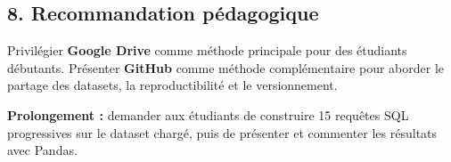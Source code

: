 \documentclass[
]{article}
\begin{document}
\subsection{8. Recommandation
pédagogique}\label{recommandation-puxe9dagogique}

Privilégier \textbf{Google Drive} comme méthode principale pour des
étudiants débutants. Présenter \textbf{GitHub} comme méthode
complémentaire pour aborder le partage des datasets, la reproductibilité
et le versionnement.

\textbf{Prolongement :} demander aux étudiants de construire 15 requêtes
SQL progressives sur le dataset chargé, puis de présenter et commenter
les résultats avec Pandas.
\end{document}
